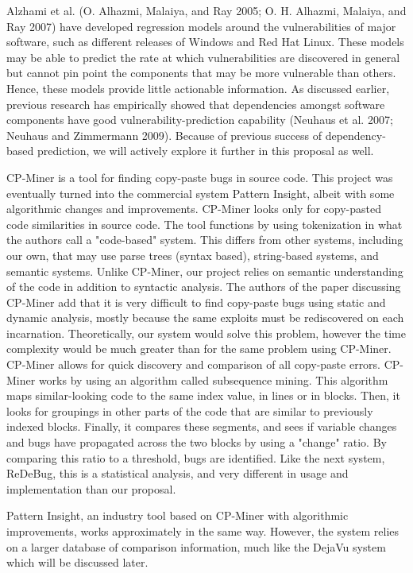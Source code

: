 \documentclass{acm_proc_article-sp}
\begin{document}
Alzhami et al. (O. Alhazmi, Malaiya, and Ray 2005; O. H. Alhazmi, Malaiya, and 
Ray 2007) have developed regression models around the vulnerabilities of major 
software, such as different releases of Windows and Red Hat Linux. These models 
may be able to predict the rate at which vulnerabilities are discovered in 
general but cannot pin point the components that may be more vulnerable than 
others. Hence, these models provide little actionable information. As discussed 
earlier, previous research has empirically showed that dependencies amongst 
software components have good vulnerability-prediction capability (Neuhaus et 
al. 2007; Neuhaus and Zimmermann 2009). Because of previous success of 
dependency-based prediction, we will actively explore it further in this 
proposal as well.

CP-Miner is a tool for finding copy-paste bugs in source code. This project was 
eventually turned into the commercial system Pattern Insight, albeit with some 
algorithmic changes and improvements. CP-Miner looks only for copy-pasted code 
similarities in source code. The tool functions by using tokenization in what 
the authors call a "code-based" system. This differs from other systems, 
including our own, that may use parse trees (syntax based), string-based 
systems, and semantic systems. Unlike CP-Miner, our project relies on semantic 
understanding of the code in addition to syntactic analysis. The authors of the 
paper discussing CP-Miner add that it is very difficult to find copy-paste bugs 
using static and dynamic analysis, mostly because the same exploits must be 
rediscovered on each incarnation. Theoretically, our system would solve this 
problem, however the time complexity would be much greater than for the same 
problem using CP-Miner. CP-Miner allows for quick discovery and comparison of 
all copy-paste errors. CP-Miner works by using an algorithm called subsequence 
mining. This algorithm maps similar-looking code to the same index value, in 
lines or in blocks. Then, it looks for groupings in other parts of the code 
that are similar to previously indexed blocks. Finally, it compares these 
segments, and sees if variable changes and bugs have propagated across the two 
blocks by using a "change" ratio. By comparing this ratio to a threshold, bugs 
are identified. Like the next system, ReDeBug, this is a statistical analysis, 
and very different in usage and implementation than our proposal.

Pattern Insight, an industry tool based on CP-Miner with algorithmic 
improvements, works approximately in the same way. However, the system relies 
on a larger database of comparison information, much like the DejaVu system 
which will be discussed later.
\end{document}
